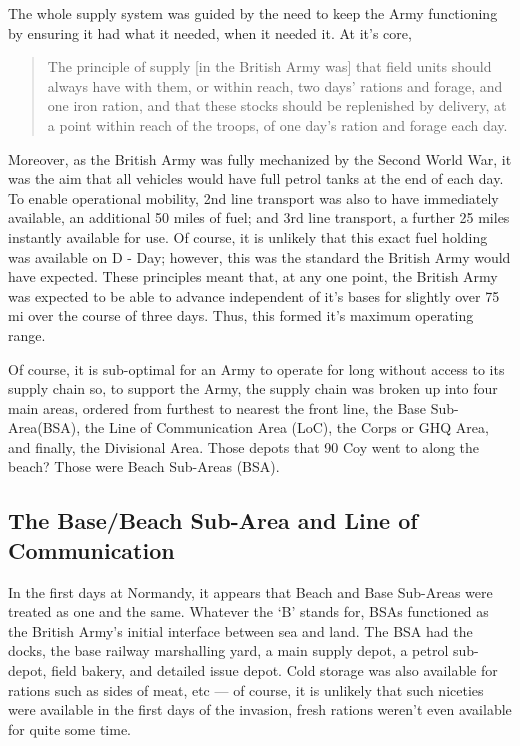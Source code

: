 \documentclass[noraggedright]{turabian-researchpaper}
\newcommand{\Petrol}{Precis of Lecture No. 12:  Petrol}
\begin{document}
The whole supply system was guided by the need to keep the Army functioning
by ensuring it had what it needed, when it needed it.  At it's core,

\begin{quotation}
	The principle of supply [in the British Army was] that field units 
	should always have
	with them, or within reach, two days' rations and forage, and one 
	iron ration, and that these stocks should be replenished by 
	delivery, at a point within reach of the troops, of one day's ration
	and forage each day. \autocite[s. 107(1)]{FSR1}
	
\end{quotation}

Moreover, as the British Army was fully mechanized by the Second World War,
it was the aim that all vehicles would have full petrol tanks at the end of
each day. To enable operational mobility, 2nd line transport was also to have 
immediately available, an additional 50 miles of fuel; and 3rd line transport,
a further 25 miles instantly available for use.\autocite[\Petrol][s 3]
{27course}
Of course, it is unlikely that this exact fuel holding was available on 
D - Day;
however, this was the standard the British Army would have expected.  These
principles meant that, at any one point, the British Army was expected to be
able to advance independent of it's bases for slightly over 75 mi over the 
course of three days.  Thus, this formed it's maximum operating range.

Of course, it is sub-optimal for an Army to operate for long without access to
its supply chain so, to support the Army, the supply chain was broken up into 
four main areas, ordered from furthest to nearest the front line, 
the Base Sub-Area(BSA), the Line of Communication Area (LoC), the Corps or 
GHQ Area, and finally, the Divisional Area.  Those depots that 90 Coy went to
along the beach?  Those were Beach Sub-Areas (BSA).  

\subsection{The Base/Beach Sub-Area and Line of Communication}

In the first days at 
Normandy, it appears that Beach and  Base Sub-Areas were treated as one and
the same.  Whatever the `B' stands for, BSAs functioned as the British Army's
initial interface between sea and land.  The BSA had %
the docks, the base railway marshalling yard, a main supply depot, a petrol
sub-depot, field bakery, and detailed issue depot. Cold storage was also 
available for rations such as sides of meat, etc --- of course, it is unlikely
that such niceties were available in the first days of the invasion, fresh
rations weren't even available for quite some time. %
\end{document}
